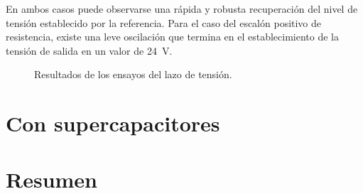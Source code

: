 En ambos casos puede observarse una rápida y robusta recuperación del nivel de tensión establecido por la referencia. Para el caso del escalón positivo de resistencia, existe una leve oscilación que termina en el establecimiento de la tensión de salida en un valor de \SI{24}{\volt}.

\begin{figure}[hbt!]
  \centering
  \caption{Resultados de los ensayos del lazo de tensión.}
  \label{var-r-lazo-tension}
\end{figure}

\section{Con supercapacitores}

\section{Resumen}

\newpage